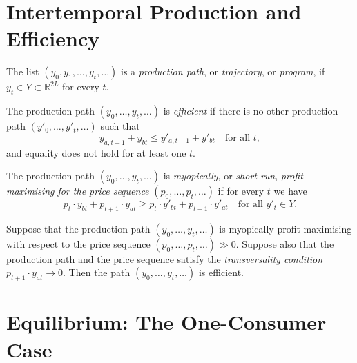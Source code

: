\addtocounter{section}{1}

\addtocounter{section}{1}

\section{Intertemporal Production and Efficiency}

\begin{defn}
    The list $(y_0, y_1, \dots, y_t, \dots)$ is a \emph{production path}, or \emph{trajectory}, or \emph{program}, if $y_t \in Y \subset \mathbb{R}^{2L}$ for every $t$.
\end{defn}

\begin{defn}
    The production path $(y_0, \dots, y_t, \dots)$ is \emph{efficient} if there is no other production path $(y'_0, \dots, y'_t, \dots)$ such that 
    \begin{equation*}
        y_{a, t-1} + y_{bt} \leq y'_{a, t-1} + y'_{bt} \quad \text{for all } t,
    \end{equation*}
    and equality does not hold for at least one $t$.
\end{defn}

\begin{defn}
    The production path $(y_0, \dots, y_t, \dots)$ is \emph{myopically}, or \emph{short-run}, \emph{profit maximising for the price sequence} $(p_0, \dots, p_t, \dots)$ if for every $t$ we have
    \begin{equation*}
        p_t \cdot y_{bt} + p_{t + 1} \cdot y_{at} \geq p_t \cdot y'_{bt} + p_{t + 1} \cdot y'_{at} \quad \text{for all } y'_t \in Y.
    \end{equation*}
\end{defn}

\begin{prop}
    Suppose that the production path $(y_0, \dots, y_t, \dots)$ is myopically profit maximising with respect to the price sequence $(p_0, \dots, p_t, \dots) \gg 0$. Suppose also that the production path and the price sequence satisfy the \emph{transversality condition} $p_{t + 1} \cdot y_{at} \to 0$. Then the path $(y_0, \dots, y_t, \dots)$ is efficient.
\end{prop}


\section{Equilibrium: The One-Consumer Case}

